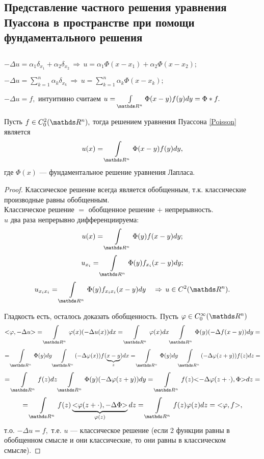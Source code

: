 \subsection{Представление частного решения уравнения Пуассона в пространстве при помощи фундаментального решения}
$ $

$-\Delta u = \alpha_1\delta_{x_1} + \alpha_2\delta_{x_2} \, \Rightarrow \, u = \alpha_1\Phi(x-x_1) + \alpha_2\Phi(x-x_2);$

$-\Delta u = \sum\limits_{k=1}^n\alpha_k\delta_{x_k}\,\Rightarrow\, u = \sum\limits_{k=1}^n\alpha_k\Phi(x-x_k);$

$-\Delta u = f,$ интуитивно считаем $u = \int\limits_{\real^n}\Phi(x-y)f(y)dy = \Phi*f.$

\begin{theorem}
Пусть $f\in C_0^2(\real^n),$ тогда решением уравнения Пуассона \eqref{Poisson} является
$$ u(x) = \int\limits_{\real^n} \Phi(x-y)f(y)dy,$$ где $\Phi(x)$ --- фундаментальное решение уравнения Лапласа.
\end{theorem}
\begin{proof}
Классическое решение всегда является обобщенным, т.к. классические производные равны обобщенным.\\ Классическое решение $=$ обобщенное решение $+$ непрерывность.\\
$u$ два раза непрерывно дифференциируема:
$$u(x) = \int\limits_{\real^n}\Phi(y)f(x-y)dy;$$
$$u_{x_i}=\int\limits_{\real^n}\Phi(y)f_{x_i}(x-y)dy;$$
$$u_{x_ix_i}=\int\limits_{\real^n}\Phi(y)f_{x_ix_i}(x-y)dy
\quad \Rightarrow \, u\in C^2(\real^n).$$

Гладкость есть, осталось доказать обобщенность. Пусть $\varphi\in C_0^\infty(\real^n)$
$$\action{\varphi, -\Delta u} = \int\limits_{\real^n} \varphi(x)(-\Delta u(x))dx = \int\limits_{\real^n}\varphi(x)dx\int\limits_{\real^n}\Phi(y)(-\Delta f(x-y))dy=$$
$$=\int\limits_{\real^n}\Phi(y)dy\int\limits_{\real^n}(-\Delta\varphi(x))f(\underbrace{x-y}_z)dx = \int\limits_{\real^n}\Phi(y)dy\int\limits_{\real^n}(-\Delta\varphi(z+y))f(z)dz = $$
$$=\int\limits_{\real^n}f(z)dz\int\limits_{\real^n}\Phi(y)(-\Delta\varphi(z+y))dy = \int\limits_{\real^n}f(z)\action{-\Delta\varphi(z+\cdot), \Phi}dz = $$
$$= \int\limits_{\real^n}f(z)\underbrace{\action{\varphi(z+\cdot), -\Delta\Phi}}_{\varphi(z)}dz = \int\limits_{\real^n}f(z)\varphi(z)dz = \action{\varphi, f},$$
т.о. $-\Delta u = f,$ т.е. $u$ --- классическое решение (если 2 функции равны в обобщенном смысле и они классические, то они равны в классическом смысле).
\end{proof}


